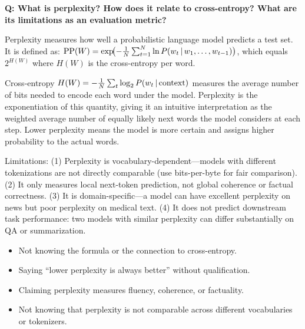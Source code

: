 \begin{interviewq}
\textbf{Q: What is perplexity?  How does it relate to cross-entropy?
What are its limitations as an evaluation metric?}

 \quad {} \quad \badgefreq{\freqhigh}

\stronganswer
Perplexity measures how well a probabilistic language model predicts a test
set.  It is defined as:
$\text{PP}(W) = \exp\!\bigl(-\frac{1}{N}\sum_{t=1}^{N} \ln P(w_t \,|\, w_1, \ldots, w_{t-1})\bigr)$,
which equals $2^{H(W)}$ where $H(W)$ is the cross-entropy per word.

Cross-entropy $H(W) = -\frac{1}{N}\sum_t \log_2 P(w_t \,|\, \text{context})$
measures the average number of bits needed to encode each word under the model.
Perplexity is the exponentiation of this quantity, giving it an intuitive
interpretation as the weighted average number of equally likely next words the
model considers at each step.  Lower perplexity means the model is more certain
and assigns higher probability to the actual words.

Limitations: (1) Perplexity is vocabulary-dependent---models with different
tokenizations are not directly comparable (use bits-per-byte for fair
comparison).  (2) It only measures local next-token prediction, not global
coherence or factual correctness.  (3) It is domain-specific---a model can
have excellent perplexity on news but poor perplexity on medical text.  (4) It
does not predict downstream task performance: two models with similar perplexity
can differ substantially on QA or summarization.

\redflags
\begin{itemize}
    \item Not knowing the formula or the connection to cross-entropy.
    \item Saying ``lower perplexity is always better'' without qualification.
    \item Claiming perplexity measures fluency, coherence, or factuality.
    \item Not knowing that perplexity is not comparable across different
          vocabularies or tokenizers.
\end{itemize}



\end{interviewq}
